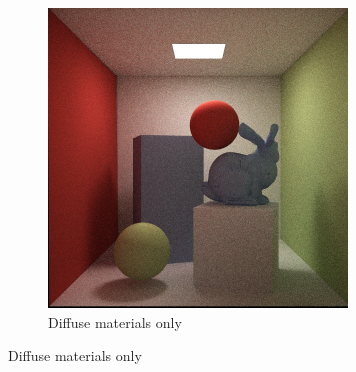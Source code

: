\documentclass[a4paper, 12pt]{report}
\begin{document}
\begin{figure}
        \centering
        \begin{subfigure}[b]{0.65\textwidth}
                \includegraphics[width=\textwidth]{figures/diffuse-100rpp-.png}
                \caption{Diffuse materials only}
                \label{fig:diff_spec1}
        \end{subfigure}%


\end{figure}
\end{document}
